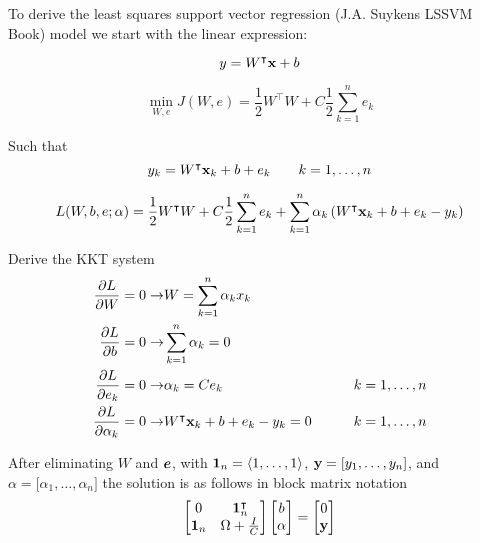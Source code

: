 To derive the least squares support vector regression (J.A. Suykens LSSVM Book) model we start with the linear expression:

\begin{equation}
  y=W^{\intercal}\vb{x}+b
\end{equation}

\begin{equation}
  \min_{W,e} J(W,e) = \frac{1}{2}W^{\intercal}W + C\frac{1}{2}\sum_{k=1}^{n}e_{k}
\end{equation}

Such that
\begin{equation}
  y_{k}=W^{\intercal}\vb{x}_{k}+b+e_{k} \qquad k=1,\dots,n
\end{equation}

\begin{equation}
  L(W,b,e;\vb{\alpha}) = \frac{1}{2}W^{\intercal}W + C\frac{1}{2}\sum_{k=1}^{n}e_{k} + \sum_{k=1}^{n}\alpha_{k} \left(W^{\intercal}\vb{x}_{k}+b+e_{k} - y_{k} \right)
\end{equation}

Derive the KKT system
\begin{equation}
  \begin{split}
    \pdv{L}{W} = 0 \rightarrow & W = \sum_{k=1}^{n}\alpha_{k}x_{k} \\
    \pdv{L}{b} = 0 \rightarrow & \sum_{k=1}^{n}\alpha_{k} = 0 \\
    \pdv{L}{e_{k}} = 0 \rightarrow & \alpha_{k} = C e_{k} & \qquad k=1,\dots,n\\
    \pdv{L}{\alpha_{k}} = 0 \rightarrow & W^{\intercal}\vb{x}_{k}+b+e_{k} - y_{k} = 0 & \qquad k=1,\dots,n\\
  \end{split}
\end{equation}

After eliminating $W$ and $\vb*{e}$, with $\vb{1}_{n} = \langle 1,\dots,1\rangle$, $\vb{y} = \lbrack y_1, \dots, y_n \rbrack $, and ${\alpha} = \lbrack \alpha_1, \dots, \alpha_n \rbrack $ the solution is as follows in block matrix notation
\begin{equation} \label{eq:lssvr_solution}
  \begin{bmatrix}
    0          & \vb{1}_{n}^{\intercal} \\
    \vb{1}_{n} & \Omega + \frac{I}{C}
  \end{bmatrix}
  \begin{bmatrix}
    b           \\
    \vb{\alpha} \\
  \end{bmatrix}
  =
  \begin{bmatrix}
    0      \\
    \vb{y} \\
  \end{bmatrix}
\end{equation}

